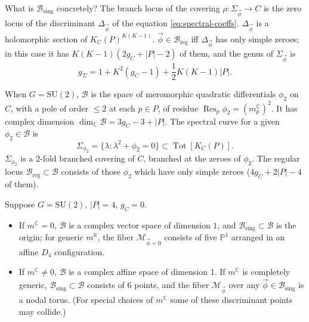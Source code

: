 \documentclass[12pt,letterpaper,reqno]{article}
\numberwithin{equation}{section}
\newcommand{\cB}{\ensuremath{\mathcal B}}
\newcommand{\cM}{\ensuremath{\mathcal M}}
\newcommand{\R}{\ensuremath{\mathbb R}}
\newcommand{\C}{\ensuremath{\mathbb C}}
\newcommand{\bbP}{\ensuremath{\mathbb P}}
\newcommand{\half}{\ensuremath{\frac{1}{2}}}
\newcommand{\sing}{\mathrm{sing}}
\newcommand{\reg}{\mathrm{reg}}
\newcommand{\abs}[1]{\lvert#1\rvert}
\newcommand{\vphi}{{\vec\phi}}
\DeclareMathOperator{\Res}{Res}
\DeclareMathOperator{\Tot}{Tot}
\newcommand{\SU}{\mathrm{SU}}
\begin{document}
\begin{defn}

\begin{remark}
What is $\cB_\sing$ concretely?
The branch locus of the covering $\rho: \Sigma_\vphi \to C$ 
is the zero locus of the discriminant $\Delta_{\vphi}$ of the equation \eqref{eq:spectral-coeffs}. $\Delta_\vphi$ 
is a holomorphic section of $K_C(P)^{K(K-1)}$.
$\vphi \in \cB_\reg$ iff $\Delta_\vphi$ has only simple zeroes; in this case
it has $K(K-1)(2g_C+\abs{P}-2)$ of them, and the genus of $\Sigma_\vphi$ is
\begin{equation}
g_\Sigma = 1 + K^2(g_C - 1) + \half K(K-1) \abs{P}.
\end{equation}
\end{remark}

\begin{example}[Hitchin base and spectral curves for $G = \SU(2)$]
When $G = \SU(2)$, $\cB$ is the space of meromorphic quadratic
differentials $\phi_2$ on $C$, with a pole of order $\le 2$ at 
each $p \in P$, of residue $\Res_p \phi_2 = (m_p^\C)^2$.
It has complex dimension
$\dim_\C \cB = 3 g_C - 3 + \abs{P}$. 
The spectral curve for a given $\phi_2 \in \cB$
is
\begin{equation}
  \Sigma_{\phi_2} = \{\lambda: \lambda^2 + \phi_2 = 0\} \subset \Tot[K_C(P)].
\end{equation}
$\Sigma_{\phi_2}$ is a $2$-fold branched covering of $C$, branched at the zeroes of $\phi_2$.
The regular locus $\cB_\reg \subset \cB$ consists of those $\phi_2$ which have only simple zeroes ($4 g_C + 2\abs{P} - 4$ of them).
\end{example}
\end{defn}


\begin{example}
Suppose $G = \SU(2)$, $\abs{P} = 4$, $g_C = 0$.
\begin{itemize}
  \item
If $m^\C = 0$, $\cB$ is a complex vector space of dimension $1$,
and $\cB_\sing \subset \cB$ is the origin;
for generic $m^\R$,
the fiber $\cM_{\vphi =0}$ consists of five $\bbP^1$
arranged in an affine $D_4$ configuration.

\item If $m^\C \neq 0$, $\cB$ is a complex affine space of dimension $1$.
If $m^\C$ is completely generic, $\cB_\sing \subset \cB$ consists
of $6$ points, and the fiber $\cM_\vphi$ over any $\vphi \in \cB_\sing$ is
a nodal torus. (For special choices of $m^\C$ some of these discriminant points 
may collide.)
\end{itemize}
\end{example}
\end{document}
